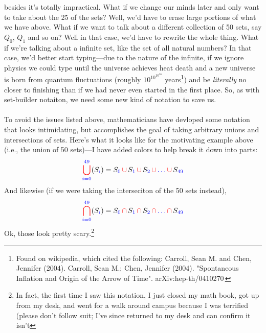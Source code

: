 \documentclass[10pt]{article}
\theoremstyle{definition}
\begin{document}
{besides it's totally impractical.  What if we change our minds later
and only want to take about the 25 of the sets? Well, we'd have to
erase large portions of what we have above.  What if we want to talk
about a different collection of 50 sets, say $Q_0$, $Q_1$ and so on?
Well in that case, we'd have to rewrite the whole thing.  What if
we're talking about a infinite set, like the set of all natural
numbers?  In that case, we'd better start typing---due to the nature
of the infinite, if we ignore physics we could type until the universe
achieves heat death and a new universe is born from quantum
fluctuations (roughly $\displaystyle 10^{10^{10^{56}}}$
years\footnote{Found on wikipedia, which cited the following: Carroll,
  Sean M. and Chen, Jennifer (2004). Carroll, Sean M.; Chen, Jennifer
  (2004). "Spontaneous Inflation and Origin of the Arrow of Time".
  arXiv:hep-th/0410270 }) and be \emph{literally} no closer to
finishing than if we had never even started in the first place.  So,
as with set-builder notaiton, we need some new kind of notation to
save us.\\~\\  To avoid the issues listed above, mathematicians have
devloped some notation that looks intimidating, but accomplishes the
goal of taking arbitrary unions and intersections of sets.  Here's
what it looks like for the motivating example above (i.e., the union
of 50 sets)---I have added colors to help break it down into parts:
\begin{equation}\label{eq:big cup}
{\color{red}\bigcup^{{\color{blue}49}}_{\color{blue}i={0}}}(S_{\color{blue}i})
=
S_{\color{blue}0}\,{\color{red}\cup}\,S_{\color{blue}1}\,{\color{red}\cup}
\,S_{\color{blue}2} \,{\color{red}\cup} \,{\color{blue}\ldots}
\,{\color{red}\cup}\, S_{\color{blue}49}
\end{equation}
And likewise (if we were taking the interseciton of the 50 sets instead),
\begin{equation}\label{eq:big cap}
{\color{red}\bigcap^{{\color{blue}49}}_{\color{blue}i=0}}(S_{\color{blue}i})
=
S_{\color{blue}0}\,{\color{red}\cap}\,S_{\color{blue}1}\,{\color{red}\cap}
\,S_{\color{blue}2} \,{\color{red}\cap} \,{\color{blue}\ldots}
\,{\color{red}\cap}\, S_{\color{blue}49}
\end{equation}
Ok, those look pretty scary.\footnote{In fact, the first time I saw
  this notation, I just closed my math book, got up from my desk, and
  went for a walk around campus because I was terrified (please don't
  follow suit; I've since returned to my desk and can confirm it isn't
}}
\end{document}
